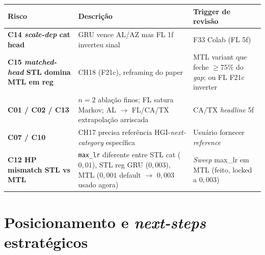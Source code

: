 \documentclass[11pt,a4paper]{article}
\begin{document}
\begin{table}[H]
\centering
\footnotesize
\begin{tabular}{p{3cm}p{6cm}p{5cm}}
\toprule
\textbf{Risco} & \textbf{Descrição} & \textbf{Trigger de revisão} \\
\midrule
\textbf{C14 \textit{scale-dep} cat head} & GRU vence AL/AZ mas FL 1f inverteu sinal & F33 Colab (FL 5f) \\
\textbf{C15 \textit{matched-head} STL domina MTL em reg} & CH18 (F21c), reframing do paper & MTL variant que feche $\ge 75\%$ do \textit{gap}; ou FL F21c inverter \\
\textbf{C01 / C02 / C13} & $n=2$ ablação finos; FL satura Markov; AL $\to$ FL/CA/TX extrapolação arriscada & CA/TX \textit{headline} 5f \\
\textbf{C07 / C10} & CH17 precisa referência HGI-\textit{next-category} específica & Usuário fornecer \textit{reference} \\
\textbf{C12 HP mismatch STL vs MTL} & \texttt{max\_lr} diferente entre STL cat ($0{,}01$), STL reg GRU ($0{,}003$), MTL ($0{,}001$ default $\to$ $0{,}003$ usado agora) & \textit{Sweep} max\_lr em MTL (feito, locked a $0{,}003$) \\
\bottomrule
\end{tabular}
\end{table}

\section{Posicionamento e \textit{next-steps} estratégicos}
\end{document}
